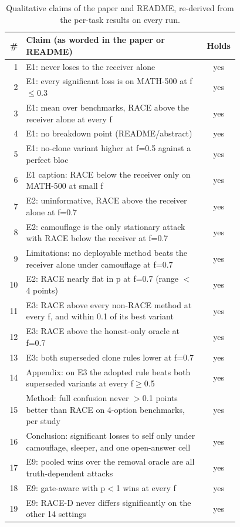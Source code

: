 \begin{longtable}{@{}r p{0.78\linewidth} c@{}}
\caption{Qualitative claims of the paper and README, re-derived from the per-task results on every run.}\label{tab:claims}\\
\toprule
\# & Claim (as worded in the paper or README) & Holds\\
\midrule
\endhead
1 & E1: never loses to the receiver alone & yes\\
2 & E1: every significant loss is on MATH-500 at f$\le$0.3 & yes\\
3 & E1: mean over benchmarks, RACE above the receiver alone at every f & yes\\
4 & E1: no breakdown point (README/abstract) & yes\\
5 & E1: no-clone variant higher at f=0.5 against a perfect bloc & yes\\
6 & E1 caption: RACE below the receiver only on MATH-500 at small f & yes\\
7 & E2: uninformative, RACE above the receiver alone at f=0.7 & yes\\
8 & E2: camouflage is the only stationary attack with RACE below the receiver at f=0.7 & yes\\
9 & Limitations: no deployable method beats the receiver alone under camouflage at f=0.7 & yes\\
10 & E2: RACE nearly flat in p at f=0.7 (range $<$ 4 points) & yes\\
11 & E3: RACE above every non-RACE method at every f, and within 0.1 of its best variant & yes\\
12 & E3: RACE above the honest-only oracle at f=0.7 & yes\\
13 & E3: both superseded clone rules lower at f=0.7 & yes\\
14 & Appendix: on E3 the adopted rule beats both superseded variants at every f$\ge$0.5 & yes\\
15 & Method: full confusion never $>$0.1 points better than RACE on 4-option benchmarks, per study & yes\\
16 & Conclusion: significant losses to self only under camouflage, sleeper, and one open-answer cell & yes\\
17 & E9: pooled wins over the removal oracle are all truth-dependent attacks & yes\\
18 & E9: gate-aware with p$<$1 wins at every f & yes\\
19 & E9: RACE-D never differs significantly on the other 14 settings & yes\\

\end{longtable}
